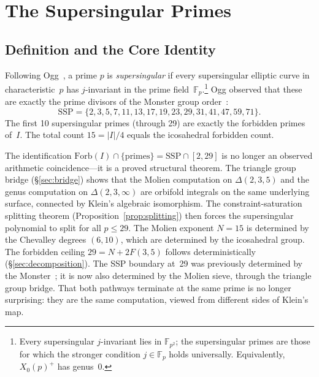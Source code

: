 \documentclass[11pt,letterpaper]{article}
\theoremstyle{definition}
\newcommand{\Forb}{\mathrm{Forb}}
\newcommand{\SSP}{\mathrm{SSP}}
\newcommand{\FF}{\mathbb{F}}
\newcommand{\abs}[1]{\lvert #1 \rvert}
\begin{document}
\section{The Supersingular Primes}\label{sec:ssp}
\subsection{Definition and the Core Identity}
Following Ogg~\cite{Ogg1975}, a prime $p$ is \emph{supersingular} if every supersingular elliptic curve in characteristic~$p$ has $j$-invariant in the prime field~$\FF_p$.\footnote{Every supersingular $j$-invariant lies in $\FF_{p^2}$; the supersingular primes are those for which the stronger condition $j\in\FF_p$ holds universally.  Equivalently, $X_0(p)^+$ has genus~0.}  Ogg observed that these are exactly the prime divisors of the Monster group order~\cite{ConwayNorton1979}:
\[
  \SSP = \{2,3,5,7,11,13,17,19,23,29,31,41,47,59,71\}.
\]
The first 10 supersingular primes (through 29) are exactly the forbidden primes of~$I$.  The total count $15=\abs{I}/4$ equals the icosahedral forbidden count.
\begin{remarkbox}
The identification $\Forb(I)\cap\{\text{primes}\}=\SSP\cap[2,29]$ is no longer an observed arithmetic coincidence---it is a proved structural theorem.  The triangle group bridge (\S\ref{sec:bridge}) shows that the Molien computation on $\Delta(2,3,5)$ and the genus computation on $\Delta(2,3,\infty)$ are orbifold integrals on the same underlying surface, connected by Klein's algebraic isomorphism.  The constraint-saturation splitting theorem (Proposition~\ref{prop:splitting}) then forces the supersingular polynomial to split for all $p\le 29$.
The Molien exponent $N=15$ is determined by the Chevalley degrees $(6,10)$, which are determined by the icosahedral group.  The forbidden ceiling $29=N+2F(3,5)$ follows deterministically (\S\ref{sec:decomposition}).  The SSP boundary at~29 was previously determined by the Monster~\cite{Ogg1975}; it is now also determined by the Molien sieve, through the triangle group bridge.  That both pathways terminate at the same prime is no longer surprising: they are the same computation, viewed from different sides of Klein's map.
\end{remarkbox}
\end{document}
